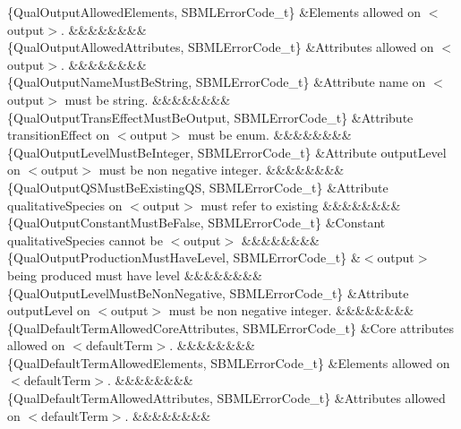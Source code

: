 \begin{DoxyParagraph}{}
\begin{longtabu}
\{Qual\+Output\+Allowed\+Elements, S\+B\+M\+L\+Error\+Code\+\_\+t\} &Elements allowed on {\ttfamily $<$output$>$}. &&&&&&&&\\
\{Qual\+Output\+Allowed\+Attributes, S\+B\+M\+L\+Error\+Code\+\_\+t\} &Attributes allowed on {\ttfamily $<$output$>$}. &&&&&&&&\\
\{Qual\+Output\+Name\+Must\+Be\+String, S\+B\+M\+L\+Error\+Code\+\_\+t\} &Attribute \textquotesingle{}name\textquotesingle{} on {\ttfamily $<$output$>$} must be string. &&&&&&&&\\
\{Qual\+Output\+Trans\+Effect\+Must\+Be\+Output, S\+B\+M\+L\+Error\+Code\+\_\+t\} &Attribute \textquotesingle{}transition\+Effect\textquotesingle{} on {\ttfamily $<$output$>$} must be enum. &&&&&&&&\\
\{Qual\+Output\+Level\+Must\+Be\+Integer, S\+B\+M\+L\+Error\+Code\+\_\+t\} &Attribute \textquotesingle{}output\+Level\textquotesingle{} on {\ttfamily $<$output$>$} must be non negative integer. &&&&&&&&\\
\{Qual\+Output\+Q\+S\+Must\+Be\+Existing\+QS, S\+B\+M\+L\+Error\+Code\+\_\+t\} &Attribute \textquotesingle{}qualitative\+Species\textquotesingle{} on {\ttfamily $<$output$>$} must refer to existing &&&&&&&&\\
\{Qual\+Output\+Constant\+Must\+Be\+False, S\+B\+M\+L\+Error\+Code\+\_\+t\} &Constant \textquotesingle{}qualitative\+Species\textquotesingle{} cannot be {\ttfamily $<$output$>$} &&&&&&&&\\
\{Qual\+Output\+Production\+Must\+Have\+Level, S\+B\+M\+L\+Error\+Code\+\_\+t\} &{\ttfamily $<$output$>$} being produced must have level &&&&&&&&\\
\{Qual\+Output\+Level\+Must\+Be\+Non\+Negative, S\+B\+M\+L\+Error\+Code\+\_\+t\} &Attribute \textquotesingle{}output\+Level\textquotesingle{} on {\ttfamily $<$output$>$} must be non negative integer. &&&&&&&&\\
\{Qual\+Default\+Term\+Allowed\+Core\+Attributes, S\+B\+M\+L\+Error\+Code\+\_\+t\} &Core attributes allowed on {\ttfamily $<$default\+Term$>$}. &&&&&&&&\\
\{Qual\+Default\+Term\+Allowed\+Elements, S\+B\+M\+L\+Error\+Code\+\_\+t\} &Elements allowed on {\ttfamily $<$default\+Term$>$}. &&&&&&&&\\
\{Qual\+Default\+Term\+Allowed\+Attributes, S\+B\+M\+L\+Error\+Code\+\_\+t\} &Attributes allowed on {\ttfamily $<$default\+Term$>$}. &&&&&&&&\\

\end{longtabu}
\end{DoxyParagraph}
